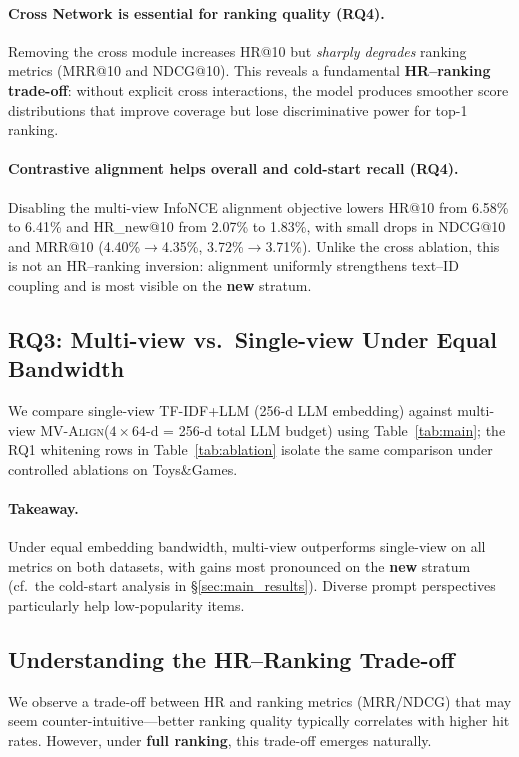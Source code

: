 \documentclass[sigconf,natbib=true,anonymous]{acmart}
\newcommand{\model}{\textsc{MV-Align}\xspace}
\begin{document}
\paragraph{Cross Network is essential for ranking quality (RQ4).}
Removing the cross module increases HR@10 but \emph{sharply degrades}
ranking metrics (MRR@10 and NDCG@10).
This reveals a fundamental \textbf{HR--ranking trade-off}: without
explicit cross interactions, the model produces smoother score
distributions that improve coverage but lose discriminative power
for top-1 ranking.

\paragraph{Contrastive alignment helps overall and cold-start recall (RQ4).}
Disabling the multi-view InfoNCE alignment objective lowers HR@10
from 6.58\% to 6.41\% and HR\_new@10 from 2.07\% to 1.83\%, with
small drops in NDCG@10 and MRR@10 (4.40\%$\rightarrow$4.35\%,
3.72\%$\rightarrow$3.71\%).
Unlike the cross ablation, this is not an HR--ranking inversion:
alignment uniformly strengthens text--ID coupling and is most
visible on the \textbf{new} stratum.

\subsection{RQ3: Multi-view vs.\ Single-view Under Equal Bandwidth}

We compare single-view TF-IDF+LLM (256-d LLM embedding) against
multi-view \model ($4\times 64$-d = 256-d total LLM budget) using
Table~\ref{tab:main}; the RQ1 whitening rows in Table~\ref{tab:ablation}
isolate the same comparison under controlled ablations on Toys\&Games.

\paragraph{Takeaway.}
Under equal embedding bandwidth, multi-view outperforms
single-view on all metrics on both datasets, with gains most
pronounced on the \textbf{new} stratum (cf.\ the cold-start
analysis in \S\ref{sec:main_results}). Diverse prompt perspectives
particularly help low-popularity items.

\subsection{Understanding the HR--Ranking Trade-off}

We observe a trade-off between HR and ranking metrics (MRR/NDCG) that
may seem counter-intuitive---better ranking quality typically correlates
with higher hit rates. However, under \textbf{full ranking}, this
trade-off emerges naturally.
\end{document}
